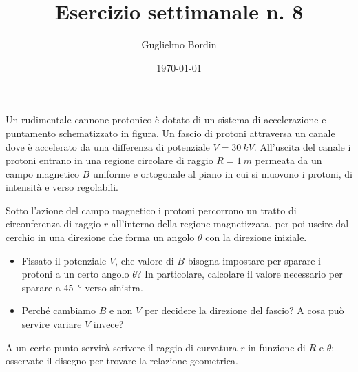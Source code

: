 \documentclass[10pt]{gulartcl}
\title{Esercizio settimanale n. 8}
\author{Guglielmo Bordin}
\date{\today}
\begin{document}
\maketitle 

\noindent
Un rudimentale cannone protonico è dotato di un sistema di accelerazione e
puntamento schematizzato in figura. Un fascio di protoni attraversa un
canale dove è accelerato da una differenza di potenziale $V =
\qty{30}{kV}$. All’uscita del canale i protoni entrano in una regione
circolare di raggio $R = \qty{1}{m}$ permeata da un campo magnetico $B$
uniforme e ortogonale al piano in cui si muovono i protoni, di intensità e
verso regolabili.

Sotto l’azione del campo magnetico i protoni percorrono
un tratto di circonferenza di raggio $r$ all’interno della regione
magnetizzata, per poi uscire dal cerchio in una direzione che forma un
angolo $\theta$ con la direzione iniziale.
\begin{itemize}
    \item Fissato il potenziale $V$, che valore di $B$ bisogna impostare
        per sparare i protoni a un certo angolo $\theta$? In particolare,
        calcolare il valore necessario per sparare a \qty{45}{\degree}
        verso sinistra.
    \item Perché cambiamo $B$ e non $V$ per decidere la direzione del
        fascio? A cosa può servire variare $V$ invece?
\end{itemize}
\begin{hint}
A un certo punto servirà scrivere il raggio di curvatura $r$ in funzione di
$R$ e $\theta$: osservate il disegno per trovare la relazione geometrica.
\end{hint}
\end{document}

